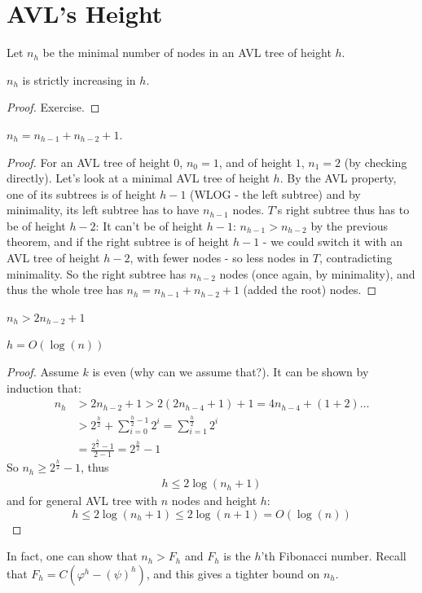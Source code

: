 \fi

\section{AVL's Height}
Let $n_h$ be the minimal number of nodes in an AVL tree of height $h$.
\begin{claim}
    $n_h$ is strictly increasing in $h$.
\end{claim}
\begin{proof} Exercise.
\end{proof}
\begin{claim}
$n_{h} = n_{h-1} + n_{h-2} + 1$.
\end{claim}
\begin{proof}For an AVL tree of height $0$, $n_0 = 1$,
and of height $1$, $n_1 = 2 $ (by checking directly).
    Let's look at a minimal AVL tree of height $h$. By the AVL property, one
of its subtrees is of height $h-1$ (WLOG - the left subtree) and by
minimality, its left subtree has to have $n_{h-1}$ nodes. $T$'s right subtree
thus has to be of height $h-2$: It can't be of height $h-1$: $n_{h-1} >
n_{h-2}$ by the previous theorem, and if the right subtree is of height $h-1$ -
we could switch it with an AVL tree of height $h-2$, with fewer nodes - so
less nodes in $T$, contradicting minimality. So the right subtree has
$n_{h-2}$ nodes (once again, by minimality), and thus the whole tree has
    $n_{h} = n_{h-1} + n_{h-2} + 1$ (added the root) nodes.
\end{proof}
\begin{corollary}$n_h > 2n_{h-2} + 1$
\end{corollary}
\begin{corollary}$h = O(\log(n))$
\end{corollary}
\begin{proof}
    Assume $k$ is even (why can we assume that?).
    It can be shown by induction that:
        \begin{equation*}
          \begin{split}
        n_h &> 2n_{h-2}+1 >2(2n_{h-4}+1)+1 = 4n_{h-4}+(1+2)\ldots  \\
         & > 2^{\frac{h}{2}}+\sum_{i=0}^{\frac{h}{2}-1} 2^i=\sum_{i=1}^{\frac{h}{2}}2^i \\
         & = \frac{2^\frac{h}{2} - 1}{2-1} =  2^{\frac{h}{2}} - 1
          \end{split}
        \end{equation*}
    So $n_h \geq 2^{\frac{h}{2}} - 1$, thus
        \begin{equation*}
          \begin{split}
        h\leq 2\log(n_h + 1)
          \end{split}
        \end{equation*}
    and for general AVL tree with $n$ nodes and height $h$:
    \[
         h\leq 2\log(n_h + 1) \leq 2\log(n + 1) = O(\log(n))
    \]
\end{proof}
\begin{remark}
    In fact, one can show that $n_h > F_h$ and $F_h$ is the $h$'th Fibonacci
    number. Recall that $F_h = C(\varphi^h - (\psi)^h)$, and this gives a
    tighter bound on $n_h$.
\end{remark}





